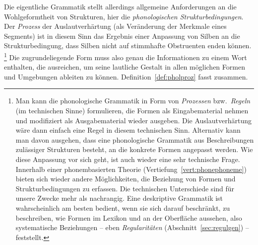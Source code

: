 Die eigentliche Grammatik stellt allerdings allgemeine Anforderungen an die Wohlgeformtheit von Strukturen, hier die \textit{phonologischen Strukturbedingungen}.
Der \textit{Prozess} der Auslautverhärtung (als Veränderung der Merkmale eines Segments) ist in diesem Sinn das Ergebnis einer Anpassung von Silben an die Strukturbedingung, dass Silben nicht auf stimmhafte Obstruenten enden können.%
\footnote{Man kann die phonologische Grammatik in Form von \textit{Prozessen} bzw.\ \textit{Regeln} (im technischen Sinne) formulieren, die Formen als Eingabematerial nehmen und modifiziert als Ausgabematerial wieder ausgeben.
Die Auslautverhärtung wäre dann einfach eine Regel in diesem technischen Sinn.
Alternativ kann man davon ausgehen, dass eine phonologische Grammatik aus Beschreibungen zulässiger Strukturen besteht, an die konkrete Formen angepasst werden.
Wie diese Anpassung vor sich geht, ist auch wieder eine sehr technische Frage.
Innerhalb einer phonembasierten Theorie (Vertiefung~\ref{vert:phonephoneme}) bieten sich wieder andere Möglichkeiten, die Beziehung von Formen und Strukturbedingungen zu erfassen.
Die technischen Unterschiede sind für unsere Zwecke mehr als nachrangig.
Eine deskriptive Grammatik ist wahrscheinlich am besten bedient, wenn sie sich darauf beschränkt, zu beschreiben, wie Formen im Lexikon und an der Oberfläche aussehen, also systematische Beziehungen -- eben \textit{Regularitäten} (Abschnitt~\ref{sec:regulgen}) -- feststellt.}
Die zugrundeliegende Form muss also genau die Informationen zu einem Wort enthalten, die ausreichen, um seine lautliche Gestalt in allen möglichen Formen und Umgebungen ableiten zu können.
Definition~\ref{def:pholproz} fasst zusammen.



